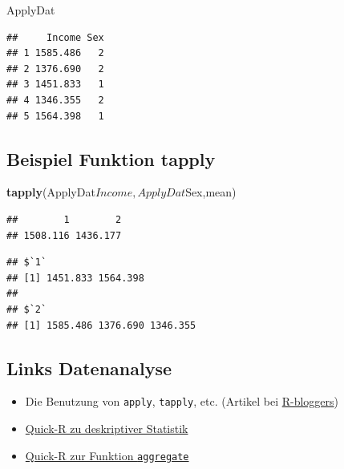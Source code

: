 \documentclass[]{article}
\newenvironment{Shaded}{\begin{snugshade}}{\end{snugshade}}
\newcommand{\KeywordTok}[1]{\textcolor[rgb]{0.13,0.29,0.53}{\textbf{{#1}}}}
\newcommand{\NormalTok}[1]{{#1}}
\begin{document}
\begin{Shaded}
\begin{Highlighting}[]
\NormalTok{ApplyDat}
\end{Highlighting}
\end{Shaded}

\begin{verbatim}
##     Income Sex
## 1 1585.486   2
## 2 1376.690   2
## 3 1451.833   1
## 4 1346.355   2
## 5 1564.398   1
\end{verbatim}

\subsection{Beispiel Funktion tapply}\label{beispiel-funktion-tapply}

\begin{Shaded}
\begin{Highlighting}[]
\KeywordTok{tapply}\NormalTok{(ApplyDat$Income,ApplyDat$Sex,mean)}
\end{Highlighting}
\end{Shaded}

\begin{verbatim}
##        1        2 
## 1508.116 1436.177
\end{verbatim}

\begin{Shaded}
\end{Shaded}

\begin{verbatim}
## $`1`
## [1] 1451.833 1564.398
## 
## $`2`
## [1] 1585.486 1376.690 1346.355
\end{verbatim}

\subsection{Links Datenanalyse}\label{links-datenanalyse}

\begin{itemize}
\item
  Die Benutzung von \texttt{apply}, \texttt{tapply}, etc. (Artikel bei
  \href{http://www.r-bloggers.com/using-apply-sapply-lapply-in-r/}{R-bloggers})
\item
  \href{http://www.statmethods.net/stats/descriptives.html}{Quick-R zu
  deskriptiver Statistik}
\item
  \href{http://www.statmethods.net/management/aggregate.html}{Quick-R
  zur Funktion \texttt{aggregate}}
\end{itemize}
\end{document}
